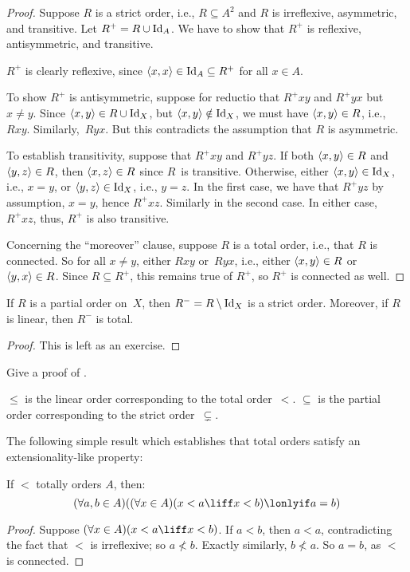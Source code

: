 \documentclass[../../../include/open-logic-section]{subfiles}
\begin{document}
\begin{proof}
Suppose $R$ is a strict order, i.e., $R \subseteq A^2$ and $R$ is
irreflexive, asymmetric, and transitive. Let $R^+ = R \cup \mathord{\mathrm{Id}_{A}}$. We
have to show that $R^+$ is reflexive, antisymmetric, and transitive.

$R^+$ is clearly reflexive, since $\langle x, x \rangle \in \mathord{\mathrm{Id}_{A}} \subseteq
R^+$ for all $x \in A$. 

To show $R^+$ is antisymmetric, suppose for reductio that $R^+xy$ and
$R^+yx$ but $x \neq y$. Since $\langle x,y \rangle \in R \cup \mathord{\mathrm{Id}_{X}}$, but
$\langle x, y \rangle \notin \mathord{\mathrm{Id}_{X}}$, we must have $\langle x, y \rangle \in R$, i.e.,
$Rxy$. Similarly,~$Ryx$. But this contradicts the assumption
that $R$ is asymmetric.

To establish transitivity, suppose that $R^+xy$ and $R^+yz$. If both
$\langle x, y \rangle \in R$ and $\langle y,z \rangle \in R$, then $\langle x, z \rangle \in
R$ since $R$~is transitive. Otherwise, either $\langle x, y \rangle \in
\mathord{\mathrm{Id}_{X}}$, i.e., $x = y$, or $\langle y, z \rangle \in \mathord{\mathrm{Id}_{X}}$, i.e., $y = z$.
In the first case, we have that $R^+yz$ by assumption, $x = y$, hence
$R^+xz$. Similarly in the second case. In either case, $R^+xz$, thus,
$R^+$ is also transitive.

Concerning the ``moreover'' clause, suppose $R$ is a total order,
i.e., that $R$ is connected. So for all $x \neq y$, either $Rxy$
or~$Ryx$, i.e., either $\langle x, y \rangle \in R$ or $\langle y, x \rangle \in R$.
Since $R \subseteq R^+$, this remains true of $R^+$, so $R^+$ is
connected as well.
\end{proof}

\begin{prop}
If $R$ is a partial order on~$X$, then $R^- = R \setminus \mathord{\mathrm{Id}_{X}}$ is a
strict order. Moreover, if $R$ is linear, then $R^-$ is total.
\end{prop}

\begin{proof}
This is left as an exercise.
\end{proof}

\begin{prob}
Give a proof of . 
\end{prob}

\begin{ex}
$\le$ is the linear order corresponding to the total 
order~$<$. $\subseteq$ is the partial order corresponding to
the strict order~$\subsetneq$.
\end{ex}

The following simple result which establishes that total orders
satisfy an extensionality-like property:

\begin{prop}
If $<$ totally orders $A$, then: 
\[
  (\forall a, b \in A)((\forall x \in A)(x < a \liff x < b) \lonlyif a = b)
\]
\end{prop}

\begin{proof}
Suppose $(\forall x \in A)(x < a \liff x < b)$. If $a < b$, then $a <
a$, contradicting the fact that $<$ is irreflexive; so $a \nless b$.
Exactly similarly, $b \nless a$. So $a = b$, as $<$ is connected.
\end{proof}
\end{document}
